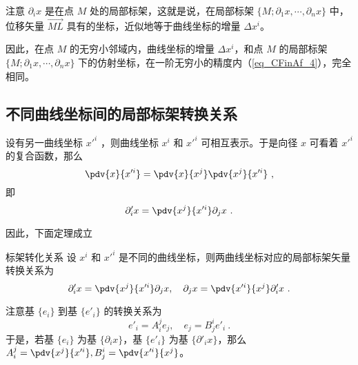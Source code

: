 注意 $\partial_i x$ 是在点 $M$ 处的局部标架，这就是说，在局部标架 $\{M;\partial_1 x,\cdots,\partial_n x\}$ 中，位移矢量 $\overrightarrow{ML}$ 具有的坐标，近似地等于曲线坐标的增量 $\Delta x^i$。

因此，在点 $M$ 的无穷小邻域内，曲线坐标的增量 $\Delta x^i$，和点 $M$ 的局部标架 $\{M;\partial_1 x,\cdots,\partial_n x\}$ 下的仿射坐标，在一阶无穷小的精度内（\autoref{eq_CFinAf_4}），完全相同。

\subsection{不同曲线坐标间的局部标架转换关系}\label{sub_CFinAf_1}

设有另一曲线坐标 $x'^i$ ，则曲线坐标 $x^i$ 和 $x'^i$ 可相互表示。于是向径 $x$ 可看着 $x'^i$ 的复合函数，那么
\begin{equation}
\pdv{x}{x'^i}=\pdv{x}{x^j}\pdv{x^j}{x'^i}~,
\end{equation}
 即
 \begin{equation}
 \partial'_i x=\pdv{x^j}{x'^i}\partial_j x~.
 \end{equation}
 
因此，下面定理成立
\begin{theorem}{标架转化关系}
设 $x^i$ 和 $x'^i$ 是不同的曲线坐标，则两曲线坐标对应的局部标架矢量转换关系为
\begin{equation}\label{eq_CFinAf_5}
\partial'_i x=\pdv{x^j}{x'^i}\partial_j x,\quad \partial_j x=\pdv{x'^i}{x^j}\partial'_i x~.
\end{equation}
\end{theorem}
注意基 $\{e_i\}$ 到基 $\{e'_i\}$ 的转换关系为
\begin{equation}
e'_i=A^j_i e_j,\quad e_j=B^i_j e'_i~.
\end{equation}
于是，若基 $\{e_i\}$ 为基 $\{\partial_i x\}$，基 $\{e'_i\}$ 为基 $\{\partial'_i x\}$，那么 $A^j_i=\pdv{x^j}{x'^i},B^i_j=\pdv{x'^i}{x^j}$。
